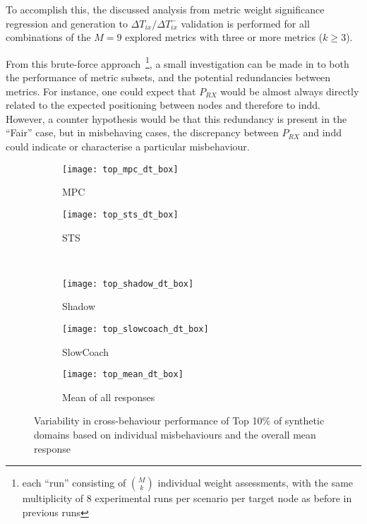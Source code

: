 To accomplish this, the discussed analysis from metric weight significance regression and generation to $\Delta{T}_{ix}/\Delta{T}_{ix}^-$ validation is performed for all combinations of the $M=9$ explored metrics with three or more metrics ($k\ge3$). 

From this brute-force approach~\footnote{each ``run'' consisting of ${M\choose{k}}$ individual weight assessments, with the same multiplicity of 8 experimental runs per scenario per target node as before in previous runs}, a small investigation can be made in to both the performance of metric subsets, and the potential redundancies between metrics. 
For instance, one could expect that $P_{RX}$ would be almost always directly related to the expected positioning between nodes and therefore to \gls{indd}.
However, a counter hypothesis would be that this redundancy is present in the ``Fair'' case, but in misbehaving cases, the discrepancy between $P_{RX}$ and \gls{indd} could indicate or characterise a particular misbehaviour. 

\begin{figure}
	\begin{subfigure}[b]{0.5\textwidth}
		\centering
		\texttt{[image: top\_mpc\_dt\_box]}
		\caption{MPC}
		\label{fig:top_mpc_dt_box}
	\end{subfigure}
	\begin{subfigure}[b]{0.5\textwidth}
		\centering
		\texttt{[image: top\_sts\_dt\_box]}
		\caption{STS}
		\label{fig:top_sts_dt_box}
	\end{subfigure}\\
	
	\begin{subfigure}[b]{0.5\textwidth}
		\centering
		\texttt{[image: top\_shadow\_dt\_box]}
		\caption{Shadow}
		\label{fig:top_shadow_dt_box}
	\end{subfigure}
	\begin{subfigure}[b]{0.5\textwidth}
		\centering
		\texttt{[image: top\_slowcoach\_dt\_box]}
		\caption{SlowCoach}
		\label{fig:top_slowcoach_dt_box}
	\end{subfigure}
	
	\centering
	\begin{subfigure}[b]{0.5\textwidth}
		\centering
		\texttt{[image: top\_mean\_dt\_box]}
		\caption{Mean of all responses}
		\label{fig:top_mean_dt_box}
	\end{subfigure}
	\caption{Variability in cross-behaviour performance of Top 10\% of synthetic domains based on individual misbehaviours and the overall mean response}\label{fig:top_dt_boxes}
\end{figure}

